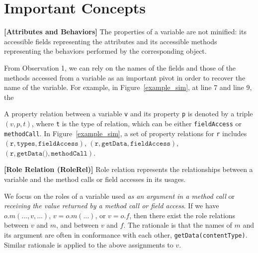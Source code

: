 \section{Important Concepts}
\label{concepts:sec}

\begin{definition}{\bf [Attributes and Behaviors]}
The properties of a variable are not minified: its accessible fields
representing the attributes and its accessible methods representing
the behaviors performed by the corresponding object.
\end{definition}

From Observation 1, we can rely on the names of the fields and those
of the methods accessed from a variable as an important pivot in order
to recover the name of the variable. For example, in
Figure~\ref{example_sim}, at line 7 and line 9, the 



A property relation between a variable \texttt{v} and its
property \texttt{p} is denoted by a triple $(v, p, t)$, 
where \texttt{t} is the type of relation, which can be 
either \texttt{fieldAccess} or \texttt{methodCall}.
In Figure~\ref{example_sim}, a set of property relations for \texttt{r}
includes $( \texttt{r}, \texttt{types}, \texttt{fieldAccess})$,
$( \texttt{r}, \texttt{getData}, \texttt{fieldAccess})$,
$( \texttt{r}, \texttt{getData()}, \texttt{methodCall})$.

\begin{definition}{\bf [Role Relation (RoleRel)]}
  Role relation represents the relationships between a variable and
  the method calls or field accesses in its usages.
\end{definition}


%
We focus on the roles of a variable used {\em as an argument in a method call}
 or {\em receiving the value returned by a method call or field access}.
%
If we have $o.m(...,v,...)$, $v = o.m(...)$, or $v = o.f$,
then there exist
the role relations between $v$ and $m$, and between $v$ and $f$. The
rationale is that the names of $m$ and its argument are often in
conformance with each other, \eg
\texttt{getData(contentType)}. Similar rationale is applied to the
above assignments to $v$.


